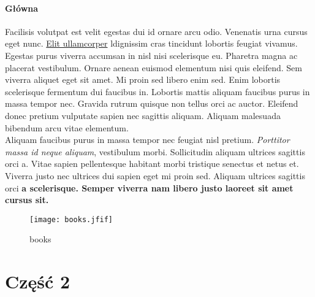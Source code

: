 \documentclass[12pt,a4paper]{article}
\begin{document}
	\subsection{Główna}
	\label{Główna}
	Facilisis volutpat est velit egestas dui id ornare arcu odio. Venenatis urna cursus eget nunc.  \underline{ Elit ullamcorper}  ldignissim cras tincidunt lobortis feugiat vivamus. Egestas purus viverra accumsan in nisl nisi scelerisque eu. Pharetra magna ac placerat vestibulum. Ornare aenean euismod elementum nisi quis eleifend. Sem viverra aliquet eget sit amet. Mi proin sed libero enim sed. Enim lobortis scelerisque fermentum dui faucibus in. Lobortis mattis aliquam faucibus purus in massa tempor nec. Gravida rutrum quisque non tellus orci ac auctor. Eleifend donec pretium vulputate sapien nec sagittis aliquam. Aliquam malesuada bibendum arcu vitae elementum.  \\Aliquam faucibus purus in massa tempor nec feugiat nisl pretium. \textit{Porttitor massa id neque aliquam}, vestibulum morbi. Sollicitudin aliquam ultrices sagittis orci a. Vitae sapien pellentesque habitant morbi tristique senectus et netus et. Viverra justo nec ultrices dui sapien eget mi proin sed. Aliquam ultrices sagittis orci  \textbf{a scelerisque. Semper viverra nam libero justo laoreet sit amet cursus sit.}
	\begin{figure}[H]
		\centering
		\texttt{[image: books.jfif]}
		\caption{books}
		\label{fig:books}
	\end{figure}
	
	\part{Część 2}
\end{document}
